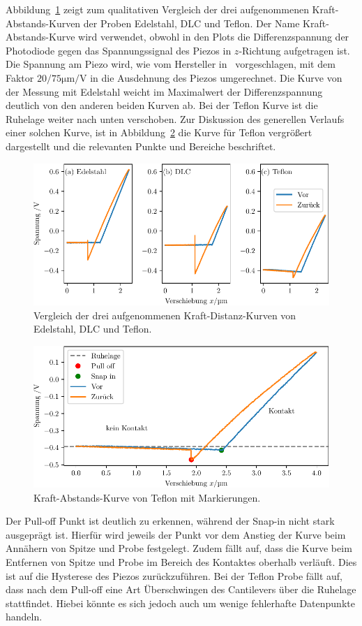 Abbildung~\ref{fig: force_distance} zeigt zum qualitativen Vergleich der drei aufgenommenen Kraft-Abstands-Kurven der Proben
Edelstahl, DLC und Teflon. Der Name Kraft-Abstands-Kurve wird verwendet, obwohl in den Plots die Differenzspannung der Photodiode
gegen das Spannungssignal des Piezos in $z$-Richtung aufgetragen ist. Die Spannung am Piezo wird, wie vom Hersteller in~\cite{afm_datasheet}
vorgeschlagen, mit dem Faktor $20 / 75 \si{\micro\meter\per\volt}$ in die Ausdehnung des Piezos umgerechnet.
Die Kurve von der Messung mit Edelstahl weicht im Maximalwert der Differenzspannung deutlich von den anderen beiden Kurven ab. Bei der
Teflon Kurve ist die Ruhelage weiter nach unten verschoben.
Zur Diskussion des generellen Verlaufs einer solchen Kurve, ist in Abbildung~\ref{fig: force_distance_teflon} die Kurve
für Teflon vergrößert dargestellt und die relevanten Punkte und Bereiche beschriftet.
\begin{figure}
  \centering
  \includegraphics[scale = 1]{../analysis/data/force_distance/force_distance.pdf}
  \caption{Vergleich der drei aufgenommenen Kraft-Distanz-Kurven von Edelstahl, DLC und Teflon.}
  \label{fig: force_distance}
\end{figure}
\begin{figure}
  \centering
  \includegraphics[scale = 1]{../analysis/data/force_distance/force_distance_teflon.pdf}
  \caption{Kraft-Abstands-Kurve von Teflon mit Markierungen.}
  \label{fig: force_distance_teflon}
\end{figure}
Der Pull-off Punkt ist deutlich zu erkennen, während der Snap-in nicht stark ausgeprägt ist. Hierfür wird
jeweils der Punkt vor dem Anstieg der Kurve beim Annähern von Spitze und Probe festgelegt. Zudem fällt auf, dass
die Kurve beim Entfernen von Spitze und Probe im Bereich des Kontaktes oberhalb verläuft. Dies ist auf die
Hysterese des Piezos zurückzuführen. Bei der Teflon Probe fällt auf, dass nach dem Pull-off eine Art Überschwingen
des Cantilevers über die Ruhelage stattfindet. Hiebei könnte es sich jedoch auch um wenige fehlerhafte Datenpunkte handeln.

